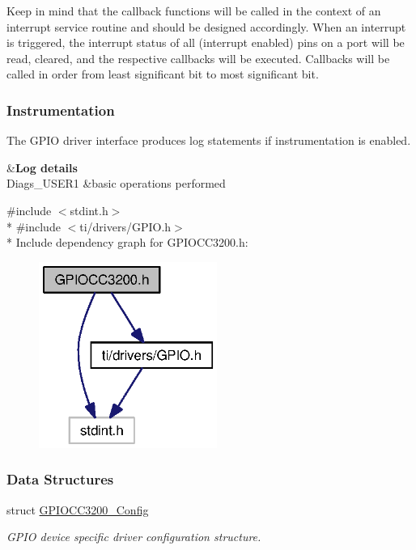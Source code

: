 Keep in mind that the callback functions will be called in the context of an interrupt service routine and should be designed accordingly. When an interrupt is triggered, the interrupt status of all (interrupt enabled) pins on a port will be read, cleared, and the respective callbacks will be executed. Callbacks will be called in order from least significant bit to most significant bit.

\subsubsection*{Instrumentation}

The G\+P\+I\+O driver interface produces log statements if instrumentation is enabled.

\begin{TabularC}{2}
\hline
{}&{\bf Log details  }\\
Diags\+\_\+\+U\+S\+E\+R1 &basic operations performed \\
\end{TabularC}


{\ttfamily \#include $<$stdint.\+h$>$}\\*
{\ttfamily \#include $<$ti/drivers/\+G\+P\+I\+O.\+h$>$}\\*
Include dependency graph for G\+P\+I\+O\+C\+C3200.\+h\+:
\nopagebreak
\begin{figure}[H]
\begin{center}
\leavevmode
\includegraphics[width=165pt]{_g_p_i_o_c_c3200_8h__incl}
\end{center}
\end{figure}
\subsubsection*{Data Structures}
\begin{DoxyCompactItemize}
\item 
struct \hyperlink{struct_g_p_i_o_c_c3200___config}{G\+P\+I\+O\+C\+C3200\+\_\+\+Config}
\begin{DoxyCompactList}\small\item\em G\+P\+I\+O device specific driver configuration structure. \end{DoxyCompactList}\end{DoxyCompactItemize}
